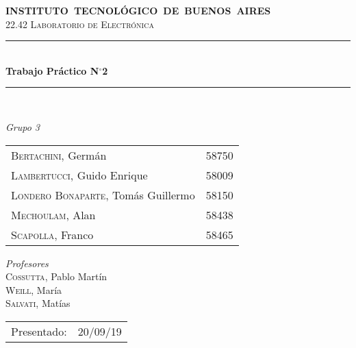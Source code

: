 \begin{titlepage}

\newcommand{\HRule}{\rule{\linewidth}{0.5mm}}
\center
\mbox{\textsc{\large \bfseries {INSTITUTO TECNOLÓGICO DE BUENOS AIRES}}}\\[1cm]
\textsc{\Large 22.42 Laboratorio de Electrónica}\\[0.5cm]


\HRule \\[0.6cm]
{ \Huge \bfseries Trabajo Práctico N$^{\circ}$2}\\[0.4cm] 
\HRule \\[1.5cm]


{\large

\emph{Grupo 3}\\
\vspace{3px}

\begin{tabular}{lr} 	
\textsc{Bertachini}, Germán  & 58750 \\ 	
\textsc{Lambertucci}, Guido Enrique  & 58009 \\
\textsc{Londero Bonaparte}, Tomás Guillermo  & 58150 \\
\textsc{Mechoulam}, Alan  &  58438\\
\textsc{Scapolla}, Franco & 58465
\end{tabular}

\vspace{20px}

\emph{Profesores}\\
\vspace{3px}
\textsc{Cossutta}, Pablo Martín\\
\textsc{Weill}, María\\
\textsc{Salvati}, Matías\\	
\vspace{100px}

\begin{tabular}{ll}

Presentado: & 20/09/19\\

\end{tabular}

}

\vfill

\end{titlepage}


